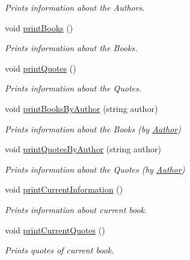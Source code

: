 \begin{DoxyCompactItemize}
\begin{DoxyCompactList}\small\item\em Prints information about the Authors. \end{DoxyCompactList}\item 
void \hyperlink{class_library_a35220a3b5a4a6d9059cc4fc18ae4c0c3}{print\+Books} ()
\begin{DoxyCompactList}\small\item\em Prints information about the Books. \end{DoxyCompactList}\item 
void \hyperlink{class_library_a819acb04f4b8aea0547db50918b1c5fa}{print\+Quotes} ()
\begin{DoxyCompactList}\small\item\em Prints information about the Quotes. \end{DoxyCompactList}\item 
void \hyperlink{class_library_a6e22621933979ff5cb4e95de3f54b72c}{print\+Books\+By\+Author} (string author)
\begin{DoxyCompactList}\small\item\em Prints information about the Books (by \hyperlink{class_author}{Author}) \end{DoxyCompactList}\item 
void \hyperlink{class_library_aa13544bfe57c61164d9953518e88dcb0}{print\+Quotes\+By\+Author} (string author)
\begin{DoxyCompactList}\small\item\em Prints information about the Quotes (by \hyperlink{class_author}{Author}) \end{DoxyCompactList}\item 
void \hyperlink{class_library_a449a2d686922007674fa4a5efff89fe7}{print\+Current\+Information} ()
\begin{DoxyCompactList}\small\item\em Prints information about current book. \end{DoxyCompactList}\item 
void \hyperlink{class_library_a7be02d15c840e3d1c3ec998e204f7bf9}{print\+Current\+Quotes} ()
\begin{DoxyCompactList}\small\item\em Prints quotes of current book. \end{DoxyCompactList}\end{DoxyCompactItemize}
